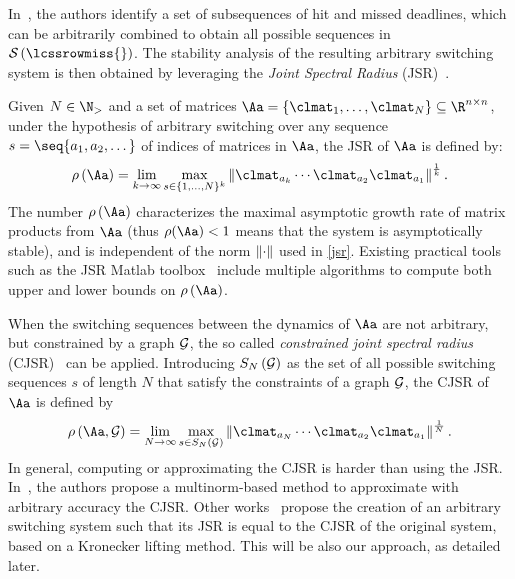 In~\cite{Maggio:2020}, the authors identify a set of subsequences of hit and missed deadlines, which can be arbitrarily combined to obtain all possible sequences in $\sset{}{\lcssrowmiss{}}$.
The stability analysis of the resulting arbitrary switching system is then obtained by leveraging the \emph{Joint Spectral Radius} (JSR)~\cite{rota}.

Given $N \in \N_{>}$ and a set of matrices $\Aa = \{\clmat_1, \ldots, \clmat_N \} \subseteq \R^{n\times n}$, under the hypothesis of arbitrary switching over any sequence $s=\seq{a_1,a_2,\dots}$ of indices of matrices in $\Aa$, the JSR of $\Aa$ is defined by:
\begin{equation}%
    \label{jsr}
    \rho\funof{\Aa} = \lim_{k\rightarrow\infty} \max_{s \in \{1,\ldots,N\}^k} \norm{\clmat_{a_k} \cdots \clmat_{a_2}\clmat_{a_1}}^{\frac{1}{k}}.
\end{equation}
The number $\rho\left(\Aa\right)$ characterizes the maximal asymptotic growth rate of matrix products from $\Aa$ (thus $\rho(\Aa) < 1$ means that the system is asymptotically stable), and is independent of the norm $\left\lVert\cdot\right\rVert$ used in \eqref{jsr}.
Existing practical tools such as the JSR Matlab toolbox~\cite{vankeerberghen2014jsr} include multiple algorithms to compute both upper and lower bounds on $\rho\left(\Aa\right)$.

When the switching sequences between the dynamics of $\Aa$ are not arbitrary, but constrained by a graph $\mathcal{G}_{}$, the so called \emph{constrained joint spectral radius} (CJSR)~\cite{dai2012gelfand} can be applied.
Introducing $S_N\left( \mathcal{G}_{} \right)$ as the set of all possible switching sequences $s$ of length $N$ that satisfy the constraints of a graph $\mathcal{G}_{}$, the CJSR of $\Aa$ is defined by
\begin{equation}%
    \label{cjsr}%
    \rho\funof{\Aa,\GG{}} = \lim_{N\rightarrow\infty} \max_{s \in S_N\funof{\GG{}}} \norm{\clmat_{a_N} \cdots \clmat_{a_2}\clmat_{a_1}}^{\frac{1}{N}}.
\end{equation}
In general, computing or approximating the CJSR is harder than using the JSR. 
In~\cite{philippe2016stability}, the authors propose a multinorm-based method to approximate with arbitrary accuracy the CJSR.
Other works~\cite{kozyakin2014berger,xu2020approximation} propose the creation of an arbitrary switching system such that its JSR is equal to the CJSR of the original system, based on a Kronecker lifting method.
This will be also our approach, as detailed later.

